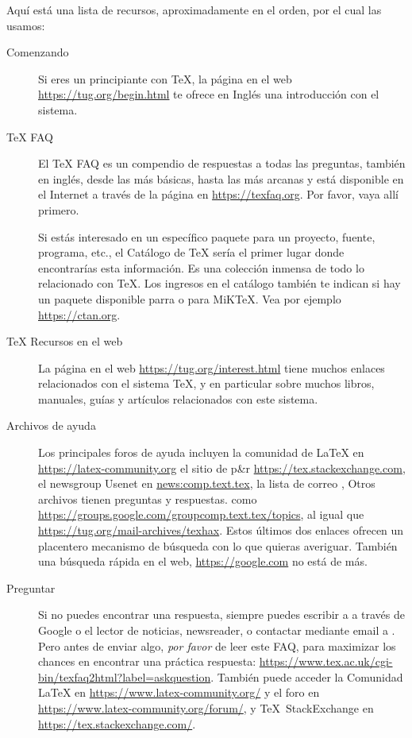 \documentclass{article}
\begin{document}
Aquí está una lista de recursos, aproximadamente en el orden, por el
cual las usamos:

\begin{description}
	\item[Comenzando] Si eres un principiante con \TeX, la página en el
	web \url{https://tug.org/begin.html} te ofrece en Inglés una
	introducción con el sistema.

\item [\TeX{} FAQ] El \TeX{} FAQ es un compendio de respuestas a
todas las preguntas, también en inglés, desde las más básicas,
hasta las más arcanas y está disponible en el Internet a través de
la página en \url{https://texfaq.org}. Por favor, vaya allí primero.

\item [\CTAN{}] Si estás
	interesado en un específico paquete para un proyecto, fuente,
	programa, etc., el Catálogo de \TeX{} sería el primer lugar
	donde encontrarías esta información. Es una colección inmensa
	de todo lo relacionado con \TeX{}.
	Los ingresos en el catálogo también te indican si hay un paquete
	disponible parra \TL{} o para MiK\TeX. Vea por ejemplo
	\url{https://ctan.org}.

\item [\TeX{} Recursos en el web] La página en el web
	\url{https://tug.org/interest.html} tiene muchos enlaces
	relacionados con el sistema \TeX{}, y en particular sobre
	muchos libros, manuales, guías y artículos relacionados con
	este sistema.

\item [Archivos de ayuda] Los principales foros de ayuda incluyen la comunidad
	de \LaTeX{} en \url{https://latex-community.org} el sitio de p\&r
	\url{https://tex.stackexchange.com}, el newsgroup Usenet en
	\url{news:comp.text.tex}, la lista de correo
	, Otros archivos tienen preguntas y
	respuestas.  como
	\url{https://groups.google.com/groupcomp.text.tex/topics}, al
	igual que \url{https://tug.org/mail-archives/texhax}. Estos
	últimos dos enlaces ofrecen un placentero mecanismo de búsqueda
	con lo que quieras averiguar.  También una búsqueda rápida en
	el web, \url{https://google.com} no está de más.

\item [Preguntar] Si no puedes encontrar una respuesta, siempre puedes
	escribir a  a través de Google o el
	lector de noticias, newsreader, o contactar mediante email a
	. Pero antes de enviar algo, \emph{por
	favor} de leer este FAQ, para maximizar los chances en
	encontrar una práctica respuesta:
	\url{https://www.tex.ac.uk/cgi-bin/texfaq2html?label=askquestion}.
	También puede acceder la Comunidad \LaTeX{} en
	\url{https://www.latex-community.org/} y el foro en
	\url{https://www.latex-community.org/forum/}, y \TeX\
	StackExchange en \url{https://tex.stackexchange.com/}.


\end{description}
\end{document}
